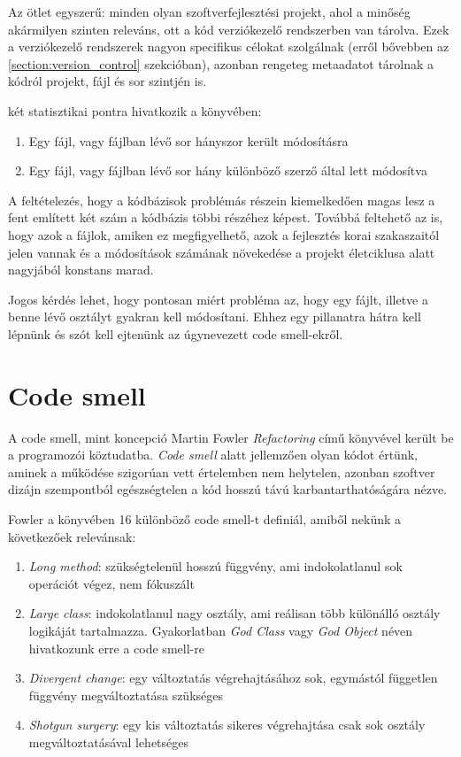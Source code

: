 Az ötlet egyszerű: minden olyan szoftverfejlesztési projekt, ahol a minőség akármilyen szinten releváns, ott a kód verziókezelő rendszerben van tárolva. Ezek a verziókezelő rendszerek nagyon specifikus célokat szolgálnak (erről bővebben az \ref{section:version_control} szekcióban), azonban rengeteg metaadatot tárolnak a kódról projekt, fájl és sor szintjén is.

\citeauthor{tornhillXrays} két statisztikai pontra hivatkozik a könyvében:
\begin{enumerate}
    \item Egy fájl, vagy fájlban lévő sor hányszor került módosításra
    \item Egy fájl, vagy fájlban lévő sor hány különböző szerző által lett módosítva
\end{enumerate}

A feltételezés, hogy a kódbázisok problémás részein kiemelkedően magas lesz a fent említett két szám a kódbázis többi részéhez képest. Továbbá feltehető az is, hogy azok a fájlok, amiken ez megfigyelhető, azok a fejlesztés korai szakaszaitól jelen vannak és a módosítások számának növekedése a projekt életciklusa alatt nagyjából konstans marad.

Jogos kérdés lehet, hogy pontosan miért probléma az, hogy egy fájlt, illetve a benne lévő osztályt gyakran kell módosítani. Ehhez egy pillanatra hátra kell lépnünk és szót kell ejtenünk az úgynevezett code smell-ekről.

\section{Code smell}

A code smell, mint koncepció Martin Fowler \textit{Refactoring}\cite{fowlerRefactoring} című könyvével került be a programozói köztudatba. \textit{Code smell} alatt jellemzően olyan kódot értünk, aminek a működése szigorúan vett értelemben nem helytelen, azonban szoftver dizájn szempontból egészségtelen a kód hosszú távú karbantarthatóságára nézve.

Fowler a könyvében 16 különböző code smell-t definiál, amiből nekünk a következőek relevánsak:
\begin{enumerate}
    \item \textit{Long method}: szükségtelenül hosszú függvény, ami indokolatlanul sok operációt végez, nem fókuszált
    \item \textit{Large class}: indokolatlanul nagy osztály, ami reálisan több különálló osztály logikáját tartalmazza. Gyakorlatban \textit{God Class} vagy \textit{God Object} néven hivatkozunk erre a code smell-re
    \item \textit{Divergent change}: egy változtatás végrehajtásához sok, egymástól független függvény megváltoztatása szükséges
    \item \textit{Shotgun surgery}: egy kis változtatás sikeres végrehajtása csak sok osztály megváltoztatásával lehetséges
\end{enumerate}

